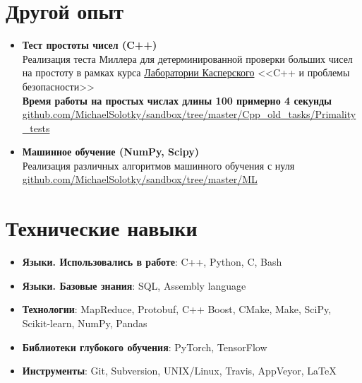 \documentclass[letterpaper,11pt]{article}
\newcommand{\resumeItem}[2]{
  \item\small{
    \textbf{#1}{: #2 \vspace{-2pt}}
  }
}
\newcommand{\resumeSubItem}[2]{\resumeItem{#1}{#2}\vspace{-4pt}}
\newcommand{\resumeSubHeadingListStart}{\begin{itemize}[leftmargin=*]}
\newcommand{\resumeSubHeadingListEnd}{\end{itemize}}
\begin{document}
\section{Другой опыт}
  \resumeSubHeadingListStart
      \item{
        \textbf{{Тест простоты чисел}{ (C++) }} \\
        Реализация теста Миллера для детерминированной проверки больших чисел на простоту в рамках курса \href{https://www.kaspersky.com/}{\color{blue} Лаборатории Касперского} <<C++ и проблемы безопасности>> \\
        \textbf{Время работы на простых числах длины 100 примерно 4 секунды} \\
        \faGithub \enspace \href{https://github.com/MichaelSolotky/sandbox/tree/master/Cpp_old_tasks/Primality_tests}{\color{blue} github.com/MichaelSolotky/sandbox/tree/master/Cpp\_old\_tasks/Primality\_tests}
      }

      \item{
        \textbf{Машинное обучение (NumPy, Scipy)} \\
        Реализация различных алгоритмов машинного обучения с нуля \\
        \faGithub \enspace \href{https://github.com/MichaelSolotky/sandbox/tree/master/ML}{\color{blue} github.com/MichaelSolotky/sandbox/tree/master/ML}
      }
      \resumeSubHeadingListEnd


\section{Технические навыки}
  \resumeSubHeadingListStart
    \resumeSubItem{Языки. Использовались в работе}{C++, Python, C, Bash}
    \resumeSubItem{Языки. Базовые знания}{SQL, Assembly language}
    \resumeSubItem{Технологии}{MapReduce, Protobuf, C++ Boost, CMake, Make, SciPy, Scikit-learn, NumPy, Pandas}
    \resumeSubItem{Библиотеки глубокого обучения}{PyTorch, TensorFlow}
    \resumeSubItem{Инструменты}{Git, Subversion, UNIX/Linux, Travis, AppVeyor, \LaTeX}
  \resumeSubHeadingListEnd

\end{document}
